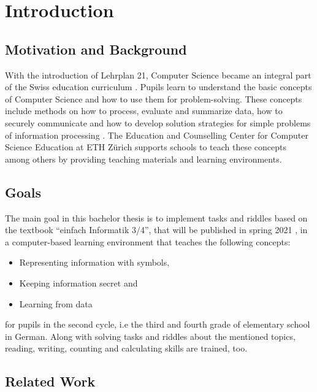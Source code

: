 \chapter{Introduction}

\section{Motivation and Background}

With the introduction of Lehrplan 21, Computer Science became an integral part of the Swiss education curriculum \cite{Lehrplan21}. Pupils learn to understand the basic concepts of Computer Science and how to use them for problem-solving. These concepts include methods on how to process, evaluate and summarize data, how to securely communicate and how to develop solution strategies for simple problems of information processing \cite{MedienUndInformatik}. The Education and Counselling Center for Computer Science Education at ETH Zürich \cite{ABZ} supports schools to teach these concepts among others by providing teaching materials and learning environments.

\section{Goals}

The main goal in this bachelor thesis is to implement tasks and riddles based on the textbook “einfach Informatik 3/4”, that will be published in spring 2021 \cite{EinfachInformatik}, in a computer-based learning environment that teaches the following concepts:

\begin{itemize}
    \item Representing information with symbols,
    \item Keeping information secret and
    \item Learning from data
\end{itemize}

for pupils in the second cycle, i.e the third and fourth grade of elementary school in German.
Along with solving tasks and riddles about the mentioned topics, reading, writing, counting and calculating skills are trained, too.

\section{Related Work}


